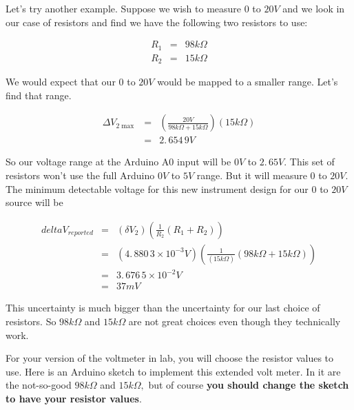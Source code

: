 Let's try another example. Suppose we wish to measure $0$ to $20\unit{V}$ and we look in our case of resistors and find we have the following two resistors to use:

\begin{eqnarray*}
	R_{1} &=&98\unit{k\Omega} \\
	R_{2} &=&15\unit{k\Omega}
\end{eqnarray*}

We would expect that our $0$ to $20\unit{V}$ would be mapped to a smaller range. Let's find that range.

\begin{eqnarray*}
	\Delta V_{2\max } &=&\left( \frac{20\unit{V}}{98\unit{k\Omega}+15\unit{k\Omega}}\right) \left( 15\unit{k\Omega}\right) \\
                      &=&2.\,\allowbreak 654\,9\unit{V}
\end{eqnarray*}

So our voltage range at the Arduino A0 input will be $0\unit{V}$ to $ 2.\,\allowbreak 65\unit{V}.$ This set of resistors won't use the full Arduino $0\unit{V}$ to $5\unit{V}$ range. But it will measure $0$ to $20 \unit{V}.$ The minimum detectable voltage for this new instrument design for
our $0$ to $20\unit{V}$ source will be 

\begin{eqnarray*}
	delta V_{reported} &=&\left( \delta V_{2}\right) \left( \frac{1}{R_{2}}\left( R_{1}+R_{2}\right) \right) \\
                       &=&\left( 4.\,\allowbreak 880\,3\times 10^{-3}\unit{V}\right) \left( \frac{1}{\left( 15\unit{k\Omega}\right) }\left( 98\unit{k\Omega}+15\unit{k\Omega}\right) \right) \\
                       &=&3.\,\allowbreak 676\,5\times 10^{-2}\unit{V} \\
                       &=&37\unit{mV}
\end{eqnarray*}

This uncertainty is much bigger than the uncertainty for our last choice of resistors. So $98\unit{k\Omega}$ and $15\unit{k\Omega}$ are not great choices even though they technically work.

For your version of the voltmeter in lab, you will choose the resistor values to use. Here is an Arduino sketch to implement this extended volt meter. In it are the not-so-good $98\unit{k\Omega}$ and $15\unit{k\Omega},$ but of course \textbf{you should change the sketch to have your resistor
values}.

